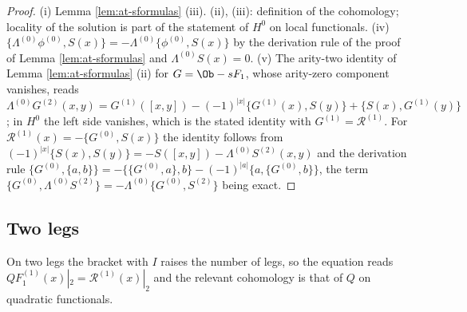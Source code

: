 \begin{proof}
(i) Lemma \ref{lem:at-sformulas} (iii). (ii), (iii): definition of the cohomology; locality of the solution is part of the statement of $H^0$ on local functionals. (iv) $\{\Lambda^{(0)}\phi^{(0)},S(x)\}=-\Lambda^{(0)}\{\phi^{(0)},S(x)\}$ by the derivation rule of the proof of Lemma \ref{lem:at-sformulas} and $\Lambda^{(0)}S(x)=0$. (v) The arity-two identity of Lemma \ref{lem:at-sformulas} (ii) for $G=\Ob-sF_1$, whose arity-zero component vanishes, reads $\Lambda^{(0)}G^{(2)}(x,y)=G^{(1)}([x,y])-(-1)^{|x|}\{G^{(1)}(x),S(y)\}+\{S(x),G^{(1)}(y)\}$; in $H^0$ the left side vanishes, which is the stated identity with $G^{(1)}=\mathcal R^{(1)}$. For $\mathcal R^{(1)}(x)=-\{G^{(0)},S(x)\}$ the identity follows from $(-1)^{|x|}\{S(x),S(y)\}=-S([x,y])-\Lambda^{(0)}S^{(2)}(x,y)$ and the derivation rule $\{G^{(0)},\{a,b\}\}=-\{\{G^{(0)},a\},b\}-(-1)^{|a|}\{a,\{G^{(0)},b\}\}$, the term $\{G^{(0)},\Lambda^{(0)}S^{(2)}\}=-\Lambda^{(0)}\{G^{(0)},S^{(2)}\}$ being exact.
\end{proof}

\subsection{Two legs}

On two legs the bracket with $I$ raises the number of legs, so the equation reads $QF_1^{(1)}(x)|_2=\mathcal R^{(1)}(x)|_2$ and the relevant cohomology is that of $Q$ on quadratic functionals.

